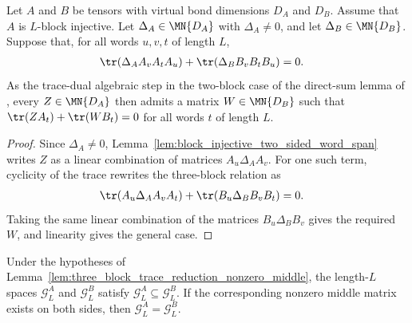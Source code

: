 \begin{lemma}
    \label{lem:three_block_trace_reduction_nonzero_middle}
    \leanok
    Let $A$ and $B$ be tensors with virtual bond dimensions $D_A$ and $D_B$.
    Assume that $A$ is $L$-block injective. Let
    $\Delta_A\in\MN{D_A}$ with $\Delta_A\neq0$, and let
    $\Delta_B\in\MN{D_B}$. Suppose that, for all words $u,v,t$ of length $L$,
    \begin{align}
        \tr\!\left(\Delta_A A_v A_t A_u\right)
        +\tr\!\left(\Delta_B B_v B_t B_u\right)
         & =0.
        \notag
    \end{align}
    As the trace-dual algebraic step in the two-block case of the
    direct-sum lemma of \cite{PerezGarcia2007Matrix}, every $Z\in\MN{D_A}$ then
    admits a matrix $W\in\MN{D_B}$ such that
    $\tr(ZA_t)+\tr(WB_t) =0$ for all words $t$ of length $L$.
\end{lemma}

\begin{proof}
    \leanok
    Since $\Delta_A\neq0$, Lemma~\ref{lem:block_injective_two_sided_word_span}
    writes $Z$ as a linear combination of matrices $A_u\Delta_A A_v$.
    For one such term, cyclicity of the trace rewrites the three-block relation
    as
    \begin{align}
        \tr(A_u\Delta_A A_vA_t)+\tr(B_u\Delta_B B_vB_t) & = 0. \notag
    \end{align}
    Taking the same linear combination of the matrices $B_u\Delta_BB_v$
    gives the required $W$, and linearity gives the general case.
\end{proof}

\begin{lemma}
    \label{lem:three_block_relation_ground_space_inclusion}
    \leanok
    Under the hypotheses of
    Lemma~\ref{lem:three_block_trace_reduction_nonzero_middle}, the length-$L$
    spaces $\mathcal G_L^A$ and $\mathcal G_L^B$ satisfy
    $\mathcal G_L^A\subseteq\mathcal G_L^B$. If the corresponding nonzero
    middle matrix exists on both sides, then
    $\mathcal G_L^A=\mathcal G_L^B$.
\end{lemma}

